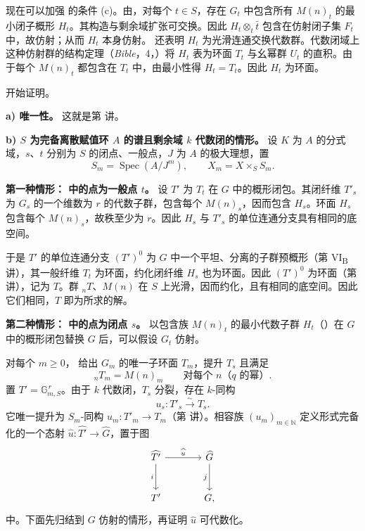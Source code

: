 现在可以加强 的条件 (c)。由，对每个 \(t\in S\)，存在 \(G_t\) 中包含所有 \(M(n)_t\) 的最小闭子概形 \(H_t\)。其构造与剩余域扩张可交换。因此 \(H_t\otimes_t\bar t\) 包含在仿射闭子集 \(F_t\) 中，故仿射；从而 \(H_t\) 本身仿射。 还表明 \(H_t\) 为光滑连通交换代数群。代数闭域上这种仿射群的结构定理（\emph{Bible}，4，）将 \(H_t\) 表为环面 \(T_t\) 与幺幂群 \(U_t\) 的直积。由于每个 \(M(n)_t\) 都包含在 \(T_t\) 中，由最小性得 \(H_t=T_t\)。因此 \(H_t\) 为环面。

开始证明。

\medskip\noindent
\textbf{a) 唯一性。}
这就是第  讲。

\medskip\noindent
\textbf{b) \(S\) 为完备离散赋值环 \(A\) 的谱且剩余域 \(k\) 代数闭的情形。}
设 \(K\) 为 \(A\) 的分式域，\(s\)、\(t\) 分别为 \(S\) 的闭点、一般点，\(J\) 为 \(A\) 的极大理想，置
\[
  S_m=\operatorname{Spec}(A/J^m),\qquad X_m=X\times_SS_m.
\]

\smallskip\noindent
\textbf{第一种情形： 中的点为一般点 \(t\)。}
设 \(T'\) 为 \(T_t\) 在 \(G\) 中的概形闭包。其闭纤维 \(T'_s\) 为 \(G_s\) 的一个维数为 \(r\) 的代数子群，包含每个 \(M(n)_s\)，因而包含 \(H_s\)。环面 \(H_s\) 包含每个 \(M(n)_s\)，故秩至少为 \(r\)。因此 \(H_s\) 与 \(T'_s\) 的单位连通分支具有相同的底空间。

于是 \(T'\) 的单位连通分支 \((T')^0\) 为 \(G\) 中一个平坦、分离的子群预概形（第 VI\textsubscript{B}~ 讲），其一般纤维 \(T_t\) 为环面，约化闭纤维 \(H_s\) 也为环面。因此 \((T')^0\) 为环面（第  讲），记为 \(T\)。群 \({}_nT\)、\(M(n)\) 在 \(S\) 上光滑，因而约化，且有相同的底空间。因此它们相同，\(T\) 即为所求的解。

\smallskip\noindent
\textbf{第二种情形： 中的点为闭点 \(s\)。}
以包含族 \(M(n)_t\) 的最小代数子群 \(H_t\)（）在 \(G\) 中的概形闭包替换 \(G\) 后，可以假设 \(G_t\) 仿射。

对每个 \(m\geq0\)， 给出 \(G_m\) 的唯一子环面 \(T_m\)，提升 \(T_s\) 且满足
\[
  {}_nT_m=M(n)_m
  \qquad\text{对每个 }n\text{（}q\text{ 的幂）}.
\]
置 \(T'=\mathbb G_{m,S}^{\,r}\)。由于 \(k\) 代数闭，\(T_s\) 分裂，存在 \(k\)-同构
\[
  u_s:T'_s\xrightarrow{\sim}T_s.
\]
它唯一提升为 \(S_m\)-同构 \(u_m:T'_m\to T_m\)（第  讲）。相容族 \((u_m)_{m\in\mathbb N}\) 定义形式完备化的一个态射 \(\widehat u:\widehat{T'}\to\widehat G\)，置于图
\[
\begin{tikzcd}[column sep=large,row sep=large]
\widehat{T'} \arrow[r,"\widehat u"] \arrow[d,"i"'] &
  \widehat G \arrow[d,"j"'] \\
T' & G ,
\end{tikzcd}
\]
中。下面先归结到 \(G\) 仿射的情形，再证明 \(\widehat u\) 可代数化。

